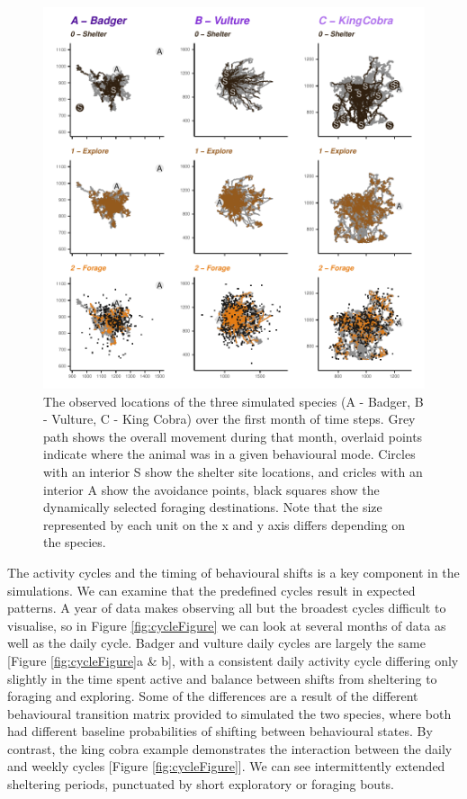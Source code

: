 \documentclass[10pt,a4paper]{article}
\begin{document}
\begin{figure}

{\centering \includegraphics{Agent-based_model_walkthrough_files/figure-latex/oneMonthMapFigure-1} 

}

\caption{The observed locations of the three simulated species (A - Badger, B - Vulture, C - King Cobra) over the first month of time steps. Grey path shows the overall movement during that month, overlaid points indicate where the animal was in a given behavioural mode. Circles with an interior S show the shelter site locations, and cricles with an interior A show the avoidance points, black squares show the dynamically selected foraging destinations. Note that the size represented by each unit on the x and y axis differs depending on the species.}\label{fig:oneMonthMapFigure}
\end{figure}

The activity cycles and the timing of behavioural shifts is a key component in the simulations.
We can examine that the predefined cycles result in expected patterns.
A year of data makes observing all but the broadest cycles difficult to visualise, so in Figure \ref{fig:cycleFigure} we can look at several months of data as well as the daily cycle.
Badger and vulture daily cycles are largely the same {[}Figure \ref{fig:cycleFigure}a \& b{]}, with a consistent daily activity cycle differing only slightly in the time spent active and balance between shifts from sheltering to foraging and exploring.
Some of the differences are a result of the different behavioural transition matrix provided to simulated the two species, where both had different baseline probabilities of shifting between behavioural states.
By contrast, the king cobra example demonstrates the interaction between the daily and weekly cycles {[}Figure \ref{fig:cycleFigure}{]}.
We can see intermittently extended sheltering periods, punctuated by short exploratory or foraging bouts.
\end{document}
